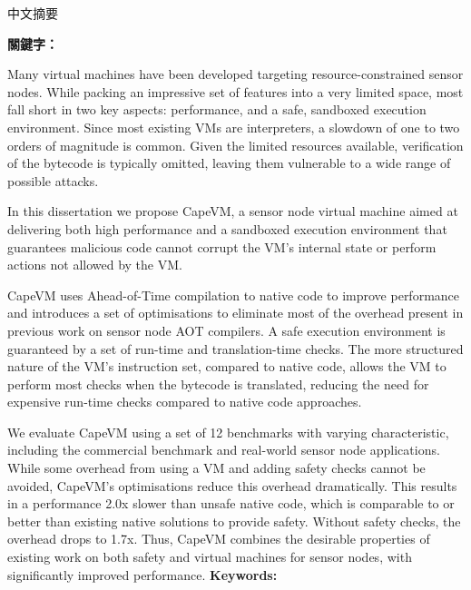 \begin{abstractzh}
中文摘要

\bigbreak
\noindent \textbf{關鍵字：}{\, \makeatletter \@keywordszh \makeatother}
\end{abstractzh}

\begin{abstracten}
Many virtual machines have been developed targeting resource-constrained sensor nodes. While packing an impressive set of features into a very limited space, most fall short in two key aspects: performance, and a safe, sandboxed execution environment. Since most existing VMs are interpreters, a slowdown of one to two orders of magnitude is common. Given the limited resources available, verification of the bytecode is typically omitted, leaving them vulnerable to a wide range of possible attacks.

In this dissertation we propose CapeVM, a sensor node virtual machine aimed at delivering both high performance and a sandboxed execution environment that guarantees malicious code cannot corrupt the VM's internal state or perform actions not allowed by the VM.

CapeVM uses Ahead-of-Time compilation to native code to improve performance and introduces a set of optimisations to eliminate most of the overhead present in previous work on sensor node AOT compilers. A safe execution environment is guaranteed by a set of run-time and translation-time checks. The more structured nature of the VM's instruction set, compared to native code, allows the VM to perform most checks when the bytecode is translated, reducing the need for expensive run-time checks compared to native code approaches.

We evaluate CapeVM using a set of 12 benchmarks with varying characteristic, including the commercial  benchmark and real-world sensor node applications.
While some overhead from using a VM and adding safety checks cannot be avoided, CapeVM's optimisations reduce this overhead dramatically. This results in a performance 2.0x slower than unsafe native code, which is comparable to or better than existing native solutions to provide safety. Without safety checks, the overhead drops to 1.7x. Thus, CapeVM combines the desirable properties of existing work on both safety and virtual machines for sensor nodes, with significantly improved performance.
\bigbreak
\noindent \textbf{Keywords: }{\, \makeatletter \@keywordsen \makeatother}
\end{abstracten}

\begin{comment}


\end{comment}






